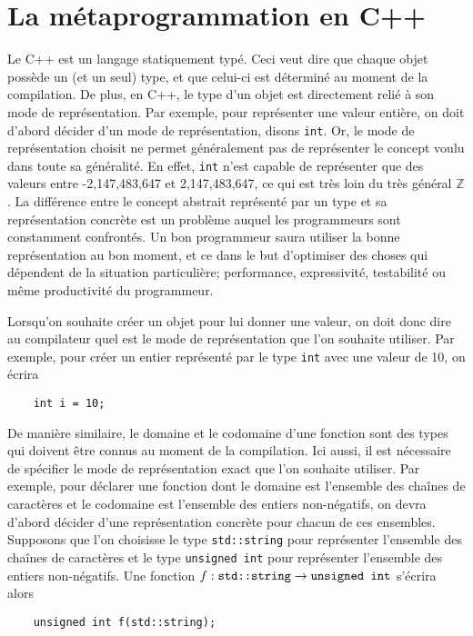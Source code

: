 \section{La métaprogrammation en C++}
Le C++ est un langage statiquement typé. Ceci veut dire que chaque objet
possède un (et un seul) type, et que celui-ci est déterminé au moment de la
compilation. De plus, en C++, le type d'un objet est directement relié à son
mode de représentation. Par exemple, pour représenter une valeur entière, on
doit d'abord décider d'un mode de représentation, disons {\tt int}. Or, le mode
de représentation choisit ne permet généralement pas de représenter le concept
voulu dans toute sa généralité. En effet, {\tt int} n'est capable de représenter
que des valeurs entre -2,147,483,647 et 2,147,483,647, ce qui est très loin
du très général $\mathbb{Z}$. La différence entre le concept abstrait
représenté par un type et sa représentation concrète est un problème auquel
les programmeurs sont constamment confrontés. Un bon programmeur saura
utiliser la bonne représentation au bon moment, et ce dans le but d'optimiser
des choses qui dépendent de la situation particulière; performance,
expressivité, testabilité ou même productivité du programmeur.

Lorsqu'on souhaite créer un objet pour lui donner une valeur, on doit donc
dire au compilateur quel est le mode de représentation que l'on souhaite
utiliser. Par exemple, pour créer un entier représenté par le type {\tt int}
avec une valeur de 10, on écrira
\begin{verbatim}
    int i = 10;
\end{verbatim}

De manière similaire, le domaine et le codomaine d'une fonction sont des
types qui doivent être connus au moment de la compilation. Ici aussi, il
est nécessaire de spécifier le mode de représentation exact que l'on souhaite
utiliser. Par exemple, pour déclarer une fonction dont le domaine est
l'ensemble des chaînes de caractères et le codomaine est l'ensemble des
entiers non-négatifs, on devra d'abord décider d'une représentation concrète
pour chacun de ces ensembles. Supposons que l'on choisisse le type
{\tt std::string} pour représenter l'ensemble des chaînes de caractères et le
type {\tt unsigned int} pour représenter l'ensemble des entiers non-négatifs.
Une fonction $f : \text{{\tt std::string}} \to \text{{\tt unsigned int}}$
s'écrira alors
\begin{verbatim}
    unsigned int f(std::string);
\end{verbatim}

